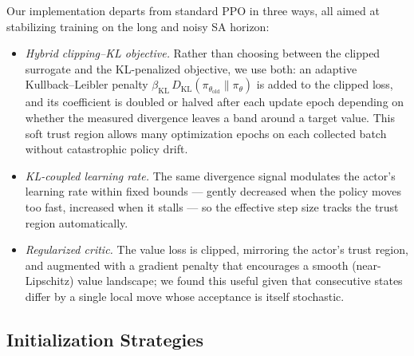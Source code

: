 \documentclass[letterpaper]{article} %
\begin{document}
Our implementation departs from standard PPO in three ways, all aimed at stabilizing training on the long and noisy SA horizon:
\begin{itemize}
    \item \textit{Hybrid clipping--KL objective.} Rather than choosing between the clipped surrogate and the KL-penalized objective, we use both: an adaptive Kullback--Leibler penalty $\beta_{\text{KL}}\, D_{\text{KL}}(\pi_{\theta_{\text{old}}} \| \pi_\theta)$ is added to the clipped loss, and its coefficient is doubled or halved after each update epoch depending on whether the measured divergence leaves a band around a target value. This soft trust region allows many optimization epochs on each collected batch without catastrophic policy drift.
    \item \textit{KL-coupled learning rate.} The same divergence signal modulates the actor's learning rate within fixed bounds --- gently decreased when the policy moves too fast, increased when it stalls --- so the effective step size tracks the trust region automatically.
    \item \textit{Regularized critic.} The value loss is clipped, mirroring the actor's trust region, and augmented with a gradient penalty that encourages a smooth (near-Lipschitz) value landscape; we found this useful given that consecutive states differ by a single local move whose acceptance is itself stochastic.
\end{itemize}


\subsection{Initialization Strategies}
\label{app:init}
\end{document}
